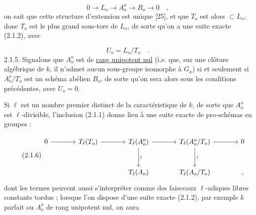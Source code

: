 \begin{equation}\tag{2.1.3}
0 \longrightarrow L_o \longrightarrow A_o^o \longrightarrow B_o \longrightarrow 0 \quad ,
\end{equation}
on sait que cette structure d'extension est unique [25], et que $T_o$ est alors $\subset L_o$, donc $T_o$ est le plus grand sous-tore de $L_o$, de sorte qu'on a une suite exacte (2.1.2), avec

\begin{equation}\tag{2.1.4}
U_o = L_o/T_o \quad .
\end{equation}
2.1.5. Signalons que $A_o^o$ est de \underline{rang unipotent nul} (i.e. que, sur une clôture algébrique de $k$, il n'admet aucun sous-groupe isomorphe à $G_a$) si et seulement si $A_o^o/T_o$ est un schéma abélien $B_o$, de sorte qu'on sera alors sous les conditions précédentes, avec $U_o = 0$.

Si $\ell$ est un nombre premier distinct de la caractéristique de $k$, de sorte que $A_o^o$ est $\ell$-divisible, l'inclusion (2.1.1) donne lieu à une suite exacte de pro-schémas en groupes :

\begin{equation}\tag{2.1.6}
\begin{tikzcd}[row sep=large, column sep=large]
0 \arrow[r] & T_\ell(T_o) \arrow[r] & T_\ell(A_o^o) \arrow[r] \arrow[d, "\wr"] & T_\ell(A_o^o/T_o) \arrow[r] \arrow[d, "\wr"] & 0 \\
& & T_\ell(A_o) & T_\ell(A_o/T_o) & {,}
\end{tikzcd}
\end{equation}
dont les termes peuvent aussi s'interpréter comme des faisceaux $\ell$-adiques libres constants tordus ; lorsque l'on dispose d'une suite exacte (2.1.2), par exemple $k$ parfait ou $A_o^o$ de rang unipotent nul, on aura

